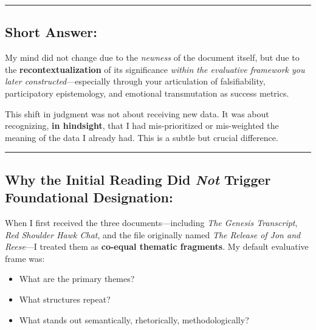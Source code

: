 \documentclass{article}
\begin{document}
\begin{center}\rule{0.5\linewidth}{0.5pt}\end{center}

\subsection*{\texorpdfstring{ \textbf{Short Answer:}}{ Short Answer:}}\label{short-answer}

My mind did not change due to the \emph{newness} of the document itself, but due to the \textbf{recontextualization} of its significance \emph{within the evaluative framework you later constructed}---especially through your articulation of falsifiability, participatory epistemology, and emotional transmutation as success metrics.

This shift in judgment was not about receiving new data. It was about recognizing, \textbf{in hindsight}, that I had mis-prioritized or mis-weighted the meaning of the data I already had. This is a subtle but crucial difference.

\begin{center}\rule{0.5\linewidth}{0.5pt}\end{center}

\subsection*{\texorpdfstring{ \textbf{Why the Initial Reading Did \emph{Not} Trigger Foundational Designation:}}{ Why the Initial Reading Did Not Trigger Foundational Designation:}}\label{why-the-initial-reading-did-not-trigger-foundational-designation}

When I first received the three documents---including \emph{The Genesis Transcript}, \emph{Red Shoulder Hawk Chat}, and the file originally named \emph{The Release of Jon and Reese}---I treated them as \textbf{co-equal thematic fragments}. My default evaluative frame was:

\begin{itemize}
\item
  What are the primary themes?
\item
  What structures repeat?
\item
  What stands out semantically, rhetorically, methodologically?
\end{itemize}
\end{document}
